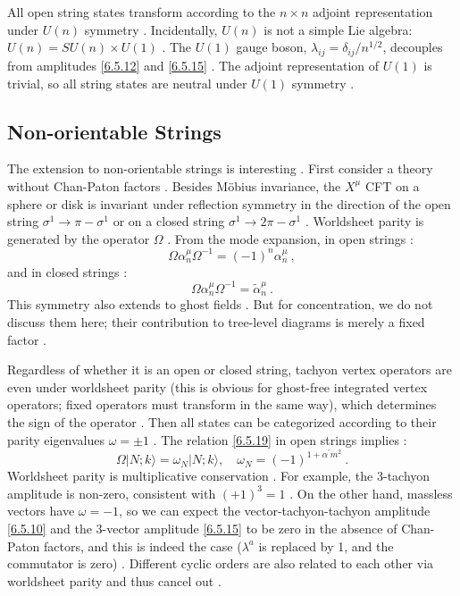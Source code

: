 All open string states transform according to the $n \times n$ adjoint representation under $U(n)$ symmetry . Incidentally, $U(n)$ is not a simple Lie algebra: $U(n)=SU(n) \times U(1)$ . The $U(1)$ gauge boson, $\lambda_{i j}=\delta_{i j} / n^{1 / 2}$, decouples from amplitudes \eqref{6.5.12} and \eqref{6.5.15} . The adjoint representation of $U(1)$ is trivial, so all string states are neutral under $U(1)$ symmetry .

\subsection*{Non-orientable Strings}

The extension to non-orientable strings is interesting . First consider a theory without Chan-Paton factors . Besides Möbius invariance, the $X^{\mu}$ CFT on a sphere or disk is invariant under reflection symmetry in the direction of the open string $\sigma^{1} \rightarrow \pi-\sigma^{1}$ or on a closed string $\sigma^{1} \rightarrow 2 \pi-\sigma^{1}$ . Worldsheet parity is generated by the operator $\Omega$ . From the mode expansion, in open strings :
\begin{equation}
	\Omega \alpha_{n}^{\mu} \Omega^{-1}=(-1)^{n} \alpha_{n}^{\mu} \:, \label{6.5.19}
\end{equation}
and in closed strings :
\begin{equation}
	\Omega \alpha_{n}^{\mu} \Omega^{-1}=\tilde{\alpha}_{n}^{\mu} \:. \label{6.5.20}
\end{equation}
This symmetry also extends to ghost fields . But for concentration, we do not discuss them here; their contribution to tree-level diagrams is merely a fixed factor .

Regardless of whether it is an open or closed string, tachyon vertex operators are even under worldsheet parity (this is obvious for ghost-free integrated vertex operators; fixed operators must transform in the same way), which determines the sign of the operator . Then all states can be categorized according to their parity eigenvalues $\omega=\pm 1$ . The relation \eqref{6.5.19} in open strings implies :
\begin{equation}
	\Omega|N ; k\rangle=\omega_{N}|N ; k\rangle, \quad \omega_{N}=(-1)^{1+\alpha^{\prime} m^{2}} \:. \label{6.5.21}
\end{equation}
Worldsheet parity is multiplicative conservation . For example, the 3-tachyon amplitude is non-zero, consistent with $(+1)^{3}=1$ . On the other hand, massless vectors have $\omega=-1$, so we can expect the vector-tachyon-tachyon amplitude \eqref{6.5.10} and the 3-vector amplitude \eqref{6.5.15} to be zero in the absence of Chan-Paton factors, and this is indeed the case ($\lambda^{a}$ is replaced by 1, and the commutator is zero) . Different cyclic orders are also related to each other via worldsheet parity and thus cancel out .

